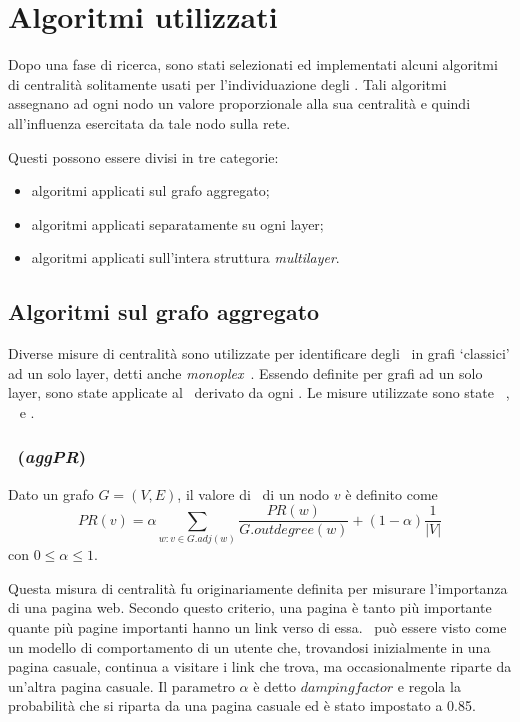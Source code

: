 \chapter{Algoritmi utilizzati}
Dopo una fase di ricerca, sono stati selezionati ed implementati alcuni algoritmi di centralità solitamente usati per 
l'individuazione degli \infsp. Tali algoritmi assegnano ad ogni nodo un valore proporzionale alla sua centralità e 
quindi all'influenza esercitata da tale nodo sulla rete.

Questi possono essere divisi in tre categorie:
\begin{itemize}
\item algoritmi applicati sul grafo aggregato;
\item algoritmi applicati separatamente su ogni layer;
\item algoritmi applicati sull'intera struttura \textit{multilayer}.
\end{itemize}

\section{Algoritmi sul grafo aggregato}
Diverse misure di centralità sono utilizzate per identificare degli \infsp\ in grafi 
`classici' ad un solo layer, detti anche \textit{monoplex}~\cite{kitsak:infsp}\cite{basaras:infsp}\cite{pei:infsp}. 
Essendo definite per grafi ad un solo layer, sono state applicate al \gragg\
derivato da ogni \muln. 
Le misure utilizzate sono state \PageRank~\cite{page:pagerank}, 
\kcore~\cite{batagelj:kcore} e 
\degree.


\subsection{\PageRank~(\textit{aggPR})}
\label{alg:pagerank}
\begin{definizione}[\PageRank]
    \label{def:pagerank}
    Dato un grafo $G=(V, E)$, il valore di \PageRank\ di un nodo $v$ è definito come
    \begin{equation}
        PR(v) = \alpha\sum_{w : v \in G.adj(w)}
        \frac{PR(w)}{G.outdegree(w)} + 
        (1-\alpha)\frac{1}{|V|}
    \end{equation}
    con $0 \le \alpha \le 1$.
\end{definizione}

Questa misura di centralità fu originariamente definita per misurare l'importanza di una pagina web. 
Secondo questo criterio, una pagina è tanto più importante quante più pagine importanti hanno un link 
verso di essa. 
\PageRank\ può essere visto come un modello di comportamento di un utente che, trovandosi inizialmente
in una pagina casuale, continua a visitare i link che trova, ma occasionalmente riparte da un'altra 
pagina casuale.
Il parametro $\alpha$ è detto $damping factor$ e regola la probabilità che si riparta da una pagina 
casuale ed è stato impostato a \num{0.85}.


